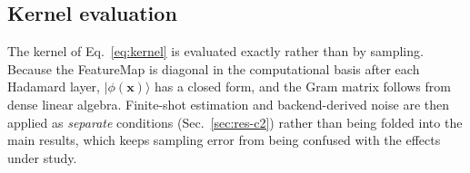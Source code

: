\subsection{Kernel evaluation}

The kernel of Eq.~\eqref{eq:kernel} is evaluated exactly rather than by
sampling. Because the \ZZ{}FeatureMap is
diagonal in the computational basis after each Hadamard layer, $|\phi(\bm{x})
\rangle$ has a closed form, and the Gram matrix follows from dense linear
algebra. Finite-shot estimation and backend-derived noise are then applied as
\emph{separate} conditions (Sec.~\ref{sec:res-c2}) rather than being folded into
the main results, which keeps sampling error from being confused with the
effects under study.
